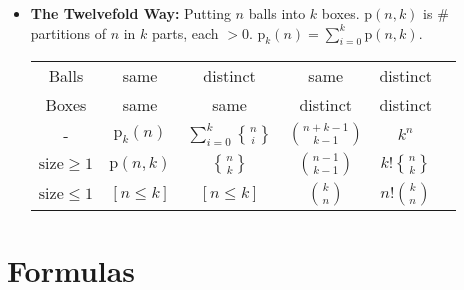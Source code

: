 \documentclass[9pt,a4paper,landscape,oneside]{amsart}
\DeclareRobustCommand{\stirling}{\genfrac\{\}{0pt}{}}
\newenvironment{myitemize}
{\begin{itemize}[leftmargin=.3cm]
	\setlength{\itemsep}{0pt}
	\setlength{\parskip}{0pt}
	\setlength{\parsep}{0pt}     }
{ \end{itemize}                  }
\begin{document}
\begin{multicols*}{3}
\begin{myitemize}
	\item \textbf{The Twelvefold Way:}
Putting $n$ balls into $k$ boxes.
$\mathrm{p}(n,k)$ is \# partitions of $n$ in $k$ parts, each $>0$.
$\mathrm{p}_k(n) = \sum_{i=0}^k \mathrm{p}(n,k)$.

\begin{tabular}{@{}c|c|c|c|c|l@{}}
	Balls & same & distinct & same & distinct\\
	Boxes & same & same & distinct & distinct\\
	\hline
	- & $\mathrm{p}_k(n)$ & $\sum_{i=0}^k \stirling{n}{i}$ & $\binom{n+k-1}{k-1}$ & $k^n$ \\
	$\mathrm{size}\ge 1$ & $\mathrm{p}(n,k)$ & $\stirling{n}{k}$ & $\binom{n-1}{k-1}$ & $k!\stirling{n}{k}$ \\
	$\mathrm{size}\le 1$ & $[n \le k]$ & $[n \le k]$ & $\binom{k}{n}$ & $n!\binom{k}{n}$ \\
	\bottomrule
\end{tabular}

\end{myitemize}

\section{Formulas}



\end{multicols*}
\end{document}
